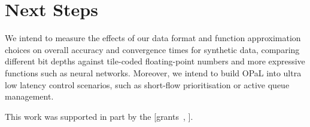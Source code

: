\documentclass[
sigconf,natbib=false
,anonymous=true
]{acmart}
\newcommand{\approachshort}{OPaL}
\begin{document}
%

\section{Next Steps}
We intend to measure the effects of our data format and function approximation choices on overall accuracy and convergence times for synthetic data, comparing different bit depths against tile-coded floating-point numbers and more expressive functions such as neural networks.
Moreover, we intend to build \approachshort{} into ultra low latency control scenarios, such as short-flow prioritisation or active queue management.

\begin{acks}
	This work was supported in part by the  [grants~, ].
\end{acks}

%
%

\printbibliography
	
\end{document}
